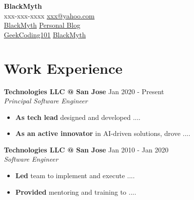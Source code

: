 \documentclass[letterpaper, 10pt]{article}
\newcommand{\iconSpace}{\hspace{2px}}
\newcommand{\bulletSpace}{\vspace{-4pt}}
\newcommand{\hSpace}{\hspace{8px}}
\newcommand{\secStartSpace}{\vspace{3pt}}
\newcommand{\secEndSpace}{\vspace{5pt}}
\newcommand{\spaceCollapse}{\vspace{-2pt}}
\newcommand{\workHeader}[3]{
\noindent \large{\textbf{\textcolor{TextColor}{#1}}} \hfill \normalsize{#3}\vspace{2pt}\\
	\textit{#2}\vspace{-2pt}
}
\newcommand{\justlarge}[1]{{\large \textbf{#1}}}
\begin{document}
\begin{center} 
	{\Huge \textbf{BlackMyth}}\\
	\vspace{1px}
 \color{TextColor}
	{
		\color{white}
             \iconSpace xxx-xxx-xxxx
		\hfill
		\href{mailto:xxxx@yahoo.com}{xxx@yahoo.com} \vspace{2pt} \iconSpace {} 
        }\\
        {
		\color{white}
             \iconSpace \href{https://www.linkedin.com/in/Black-Myth/}{BlackMyth}
		\hfill
		\href{https://geekcoding101.com/}{Personal Blog} \vspace{2pt} \iconSpace {} 
        }\\
	{
            \color{white}
		 \iconSpace \href{https://github.com/geekcoding101}{GeekCoding101}
            \hfill
		\href{https://github.com/BlackMyth}{BlackMyth} \iconSpace {} 
	}
\end{center}
\spaceCollapse
\spaceCollapse


\section{\texorpdfstring{\color{blue} \textbf{Work Experience}}{Work Experience}}
\secStartSpace

\begin{addmargin}[0.5em]{1em}
	\workHeader{Technologies LLC @ San Jose}{Principal Software Engineer}{Jan 2020 - Present}
	\begin{itemize}
            \item \justlarge{As tech lead} designed and developed ....
                \bulletSpace
            \item \justlarge{As an active innovator} in AI-driven solutions, drove ....
	\end{itemize}
		
	\workHeader{Technologies LLC @ San Jose}{Software Engineer}{Jan 2010 - Jan 2020}
	\begin{itemize}
            \sloppy
		\item \justlarge{Led} team to implement and execute ....
		      \bulletSpace
		\item \justlarge{Provided} mentoring and training to ....
                \bulletSpace
	\end{itemize}
\end{addmargin}
\secEndSpace
\end{document}
